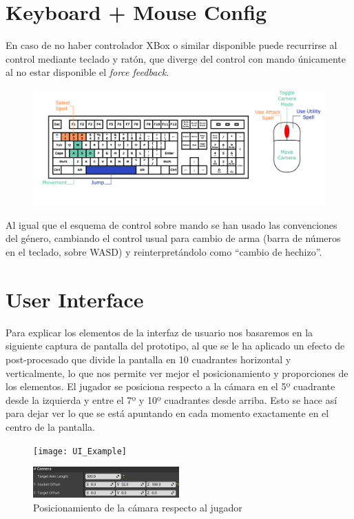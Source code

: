 \documentclass[12pt]{report}
\begin{document}
\section{Keyboard + Mouse Config}
\label{control2}

En caso de no haber controlador XBox o similar disponible puede recurrirse al control mediante teclado y ratón, que diverge del control con mando únicamente al no estar disponible el \textit{force feedback}.

\begin{figure}[h]
    \centering
    \includegraphics[width=\textwidth]{keyboard}
\end{figure}

Al igual que el esquema de control sobre mando se han usado las convenciones del género, cambiando el control usual para cambio de arma (barra de números en el teclado, sobre WASD) y reinterpretándolo como ``cambio de hechizo''.

\section{User Interface}

Para explicar los elementos de la interfaz de usuario nos basaremos en la siguiente captura de pantalla del prototipo, al que se le ha aplicado un efecto de post-procesado que divide la pantalla en 10 cuadrantes horizontal y verticalmente, lo que nos permite ver mejor el posicionamiento y proporciones de los elementos. El jugador se posiciona respecto a la cámara en el 5º cuadrante desde la izquierda y entre el 7º y 10º cuadrantes desde arriba. Esto se hace así para dejar ver lo que se está apuntando en cada momento exactamente en el centro de la pantalla.

\begin{figure}[h]
    \centering
    \texttt{[image: UI\_Example]}
\end{figure}

\begin{figure}[h]
    \centering
    \includegraphics[width=0.5\textwidth]{camera_position_presets}
    \caption{Posicionamiento de la cámara respecto al jugador}
\end{figure}
\end{document}
